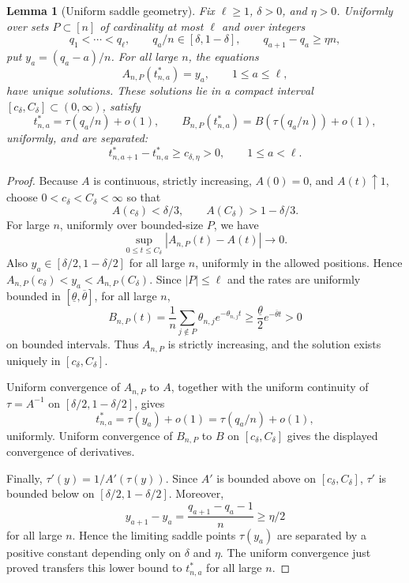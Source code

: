 \documentclass[11pt]{article}
\newtheorem{lemma}[theorem]{Lemma}
\theoremstyle{remark}
\begin{document}
\begin{lemma}[Uniform saddle geometry]\label{lem:regular-saddle-geometry}
Fix \(\ell\ge1\), \(\delta>0\), and \(\eta>0\).  Uniformly over sets \(P\subset[n]\) of cardinality at most \(\ell\) and over integers
\[
        q_1<\cdots<q_\ell,
        \qquad q_a/n\in[\delta,1-\delta],
        \qquad q_{a+1}-q_a\ge \eta n,
\]
put \(y_a=(q_a-a)/n\).  For all large \(n\), the equations
\[
        A_{n,P}(t_{n,a}^*)=y_a,
        \qquad 1\le a\le\ell,
\]
have unique solutions.  These solutions lie in a compact interval
\([c_\delta,C_\delta]\subset(0,\infty)\), satisfy
\[
        t_{n,a}^*=\tau(q_a/n)+o(1),
        \qquad
        B_{n,P}(t_{n,a}^*)=B(\tau(q_a/n))+o(1),
\]
uniformly, and are separated:
\[
        t_{n,a+1}^*-t_{n,a}^*\ge c_{\delta,\eta}>0,
        \qquad 1\le a<\ell .
\]
\end{lemma}

\begin{proof}
Because \(A\) is continuous, strictly increasing, \(A(0)=0\), and \(A(t)\uparrow1\), choose \(0<c_\delta<C_\delta<\infty\) so that
\[
        A(c_\delta)<\delta/3,
        \qquad
        A(C_\delta)>1-\delta/3 .
\]
For large \(n\), uniformly over bounded-size \(P\), we have
\[
        \sup_{0\le t\le C_\delta}|A_{n,P}(t)-A(t)|\to0.
\]
Also \(y_a\in[\delta/2,1-\delta/2]\) for all large \(n\), uniformly in the allowed positions.  Hence \(A_{n,P}(c_\delta)<y_a<A_{n,P}(C_\delta)\).  Since \(|P|\le\ell\) and the rates are uniformly bounded in \([\underline\theta,\overline\theta]\), for all large \(n\),
\[
        B_{n,P}(t)
        =\frac1n\sum_{j\notin P}\theta_{n,j}e^{-\theta_{n,j}t}
        \ge \frac{\underline\theta}{2}e^{-\overline\theta t}>0
\]
on bounded intervals.  Thus \(A_{n,P}\) is strictly increasing, and the solution exists uniquely in \([c_\delta,C_\delta]\).

Uniform convergence of \(A_{n,P}\) to \(A\), together with the uniform continuity of \(\tau=A^{-1}\) on \([\delta/2,1-\delta/2]\), gives
\[
        t_{n,a}^*=\tau(y_a)+o(1)=\tau(q_a/n)+o(1),
\]
uniformly.  Uniform convergence of \(B_{n,P}\) to \(B\) on \([c_\delta,C_\delta]\) gives the displayed convergence of derivatives.

Finally, \(\tau'(y)=1/A'(\tau(y))\).  Since \(A'\) is bounded above on \([c_\delta,C_\delta]\), \(\tau'\) is bounded below on \([\delta/2,1-\delta/2]\).  Moreover,
\[
        y_{a+1}-y_a=\frac{q_{a+1}-q_a-1}{n}\ge \eta/2
\]
for all large \(n\).  Hence the limiting saddle points \(\tau(y_a)\) are separated by a positive constant depending only on \(\delta\) and \(\eta\).  The uniform convergence just proved transfers this lower bound to \(t_{n,a}^*\) for all large \(n\).
\end{proof}
\end{document}
